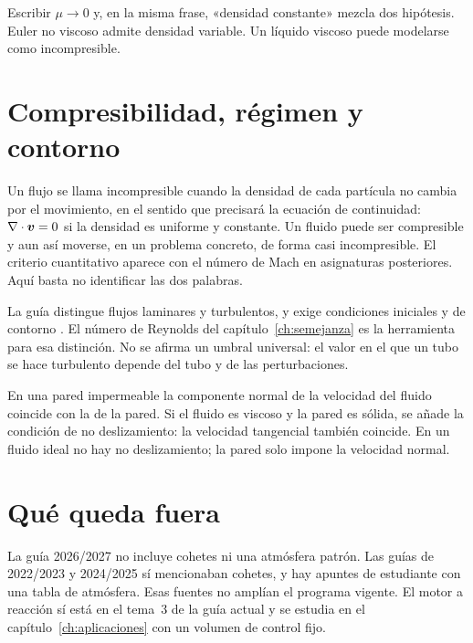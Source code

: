\begin{errorbox}
Escribir \(\mu\to 0\) y, en la misma frase, «densidad constante» mezcla dos hipótesis. Euler no viscoso admite densidad variable. Un líquido viscoso puede modelarse como incompresible.
\end{errorbox}

\section{Compresibilidad, régimen y contorno}

Un flujo se llama incompresible cuando la densidad de cada partícula no cambia por el movimiento, en el sentido que precisará la ecuación de continuidad: \(\nabla\cdot\boldsymbol{v}=0\) si la densidad es uniforme y constante. Un fluido puede ser compresible y aun así moverse, en un problema concreto, de forma casi incompresible. El criterio cuantitativo aparece con el número de Mach en asignaturas posteriores. Aquí basta no identificar las dos palabras.

La guía distingue flujos laminares y turbulentos, y exige condiciones iniciales y de contorno \parencite{uleGuia2026}. El número de Reynolds del capítulo~\ref{ch:semejanza} es la herramienta para esa distinción. No se afirma un umbral universal: el valor en el que un tubo se hace turbulento depende del tubo y de las perturbaciones.

En una pared impermeable la componente normal de la velocidad del fluido coincide con la de la pared. Si el fluido es viscoso y la pared es sólida, se añade la condición de no deslizamiento: la velocidad tangencial también coincide. En un fluido ideal no hay no deslizamiento; la pared solo impone la velocidad normal.

\section{Qué queda fuera}

La guía 2026/2027 no incluye cohetes ni una atmósfera patrón. Las guías de 2022/2023 y 2024/2025 sí mencionaban cohetes, y hay apuntes de estudiante con una tabla de atmósfera. Esas fuentes no amplían el programa vigente. El motor a reacción sí está en el tema~3 de la guía actual y se estudia en el capítulo~\ref{ch:aplicaciones} con un volumen de control fijo.

